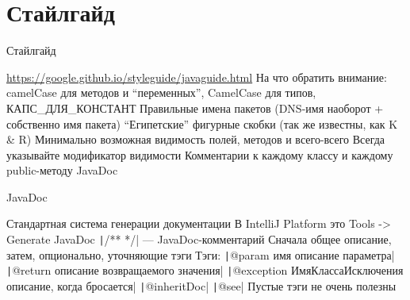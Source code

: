\documentclass{../../slides-style}
\begin{document}
    \section{Стайлгайд}

    \begin{frame}{Стайлгайд}
        \begin{outline}
            \1 \url{https://google.github.io/styleguide/javaguide.html}
            \1 На что обратить внимание:
                \2 camelCase для методов и \enquote{переменных}, CamelCase для типов, КАПС\_ДЛЯ\_КОНСТАНТ
                \2 Правильные имена пакетов (DNS-имя наоборот + собственно имя пакета)
                \2 \enquote{Египетские} фигурные скобки (так же известны, как K \& R)
                \2 Минимально возможная видимость полей, методов и всего-всего
                    \3 Всегда указывайте модификатор видимости
                \2 Комментарии к каждому классу и каждому public-методу
                    \3 JavaDoc
        \end{outline}
    \end{frame}

    \begin{frame}{JavaDoc}
        \begin{outline}
            \1 Стандартная система генерации документации
            \1 В IntelliJ Platform это Tools -> Generate JavaDoc
            \1 \texttt|/**  */| --- JavaDoc-комментарий
            \1 Сначала общее описание, затем, опционально, уточняющие тэги
            \1 Тэги:
                \2 \texttt|@param имя описание параметра|
                \2 \texttt|@return описание возвращаемого значения|
                \2 \texttt|@exception ИмяКлассаИсключения описание, когда бросается|
                \2 \texttt|{@inheritDoc}|
                \2 \texttt|@see|
            \1 Пустые тэги не очень полезны
        \end{outline}
    \end{frame}
\end{document}
